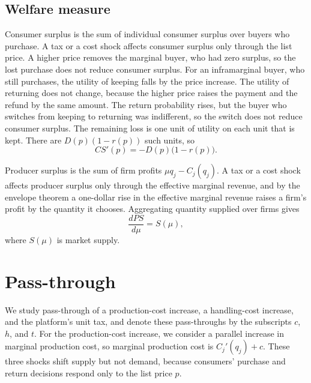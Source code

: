 \documentclass[11pt]{article}
\begin{document}
\subsection{Welfare measure}

Consumer surplus is the sum of individual consumer surplus over buyers who
purchase. A tax or a cost shock affects consumer surplus only through
the list price. A higher price removes the marginal buyer, who had zero
surplus, so the lost purchase does not reduce consumer surplus. For an
inframarginal buyer, who still purchases, the utility of keeping falls by
the price increase. The utility of returning does not change, because the
higher price raises the payment and the refund by the same amount. The
return probability rises, but the buyer who switches from keeping to
returning was indifferent, so the switch does not reduce consumer
surplus. The remaining loss is one unit of utility on each unit that is
kept. There are $D(p)(1-r(p))$ such units, so
\begin{equation}
  CS'(p)=-D(p)\bigl(1-r(p)\bigr).
\end{equation}

Producer surplus is the sum of firm profits
$\mu q_j-C_j(q_j)$. A tax or a cost shock affects producer surplus
only through the effective marginal revenue, and by the envelope theorem a
one-dollar rise in the effective marginal revenue raises a firm's profit by the
quantity it chooses. Aggregating quantity supplied over firms gives
\begin{equation}
  \frac{dPS}{d\mu}=S(\mu),
\end{equation}
where $S(\mu)$ is market supply.

\section{Pass-through}

We study pass-through of a production-cost increase, a handling-cost
increase, and the platform's unit tax, and denote these pass-throughs
by the subscripts $c$, $h$, and $t$. For the production-cost increase, we
consider a parallel increase in marginal production cost, so marginal
production cost is $C_j'(q_j)+c$. These three shocks shift supply but not
demand, because consumers' purchase and return decisions respond only to
the list price $p$.
\end{document}
